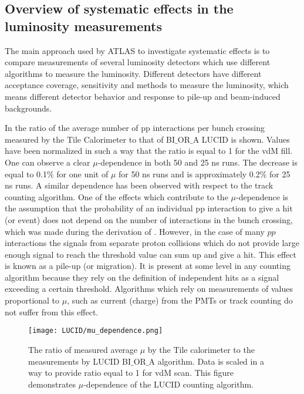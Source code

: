 \subsection{Overview of systematic effects in the luminosity measurements}

The main approach used by ATLAS to investigate systematic effects is to compare measurements of several luminosity detectors which use different algorithms to measure the luminosity.
Different detectors have different acceptance coverage, sensitivity and methods to measure the luminosity, 
which means different detector behavior and response to pile-up and beam-induced backgrounds.

In  the ratio of the average number of pp interactions per bunch crossing measured by the Tile Calorimeter to that of BI$\_$OR$\_$A LUCID is shown.
Values have been normalized in such a way that the ratio is equal to 1 for the vdM fill.
One can observe a clear $\mu$-dependence in both 50 and 25 ns runs. 
The decrease is equal to 0.1$\%$ for one unit of $\mu$ for 50 ns runs and is approximately 0.2$\%$ for 25 ns runs.
A similar dependence has been observed with respect to the track counting algorithm.
One of the effects which contribute to the $\mu$-dependence is the assumption that the probability of an individual pp interaction to give a hit (or event) does not depend on the number of interactions in the bunch crossing, which was made during the derivation of .
However, in the case of many $pp$ interactions the signals from separate proton collisions which do not provide large enough signal to reach the threshold value can sum up and give a hit. 
This effect is known as a pile-up (or migration).
It is present at some level in any counting algorithm because they rely on the definition of independent hits as a signal exceeding a certain threshold.
Algorithms which rely on measurements of values proportional to $\mu$, such as current (charge) from the PMTs or track counting do not suffer from this effect.



\begin{figure}
\centering
\texttt{[image: LUCID/mu\_dependence.png]}
\caption{The ratio of measured average $\mu$ by the Tile calorimeter to the measurements by LUCID BI$\_$OR$\_$A algorithm. Data is scaled in a way to provide ratio equal to 1 for vdM scan.
This figure demonstrates $\mu$-dependence of the LUCID counting algorithm.}
\label{fig:mu_dependence}
\end{figure}

